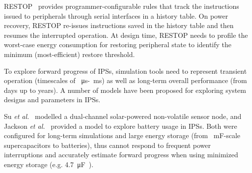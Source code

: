 RESTOP~\cite{rodriguez2018restop} provides programmer-configurable rules that track the instructions issued to peripherals through serial interfaces in a history table.
On power recovery, RESTOP re-issues instructions saved in the history table and then resumes the interrupted operation. 
At design time, RESTOP needs to profile the worst-case energy consumption for restoring peripheral state to identify the minimum (most-efficient) restore threshold. 






To explore forward progress of IPSs, simulation tools need to represent transient operation (timescales of \SI{}{\micro\second}-\SI{}{\milli\second}) as well as long-term overall performance (from days up to years). 
A number of models have been proposed for exploring system designs and parameters in IPSs.

Su \textit{et al.}~\cite{Su:2019:TFR:3340300.3320270} modelled a dual-channel solar-powered non-volatile sensor node, and Jackson \textit{et al.}~\cite{Jackson:2019:COC:3302506.3310400} provided a model to explore battery usage in IPSs. 
Both were configured for long-term simulations and large energy storage (from \SI{}{\milli\farad}-scale supercapacitors to batteries), thus cannot respond to frequent power interruptions and accurately estimate forward progress when using minimized energy storage (e.g. \SI{4.7}{\micro\farad}~\cite{10.1145/3281300}).

